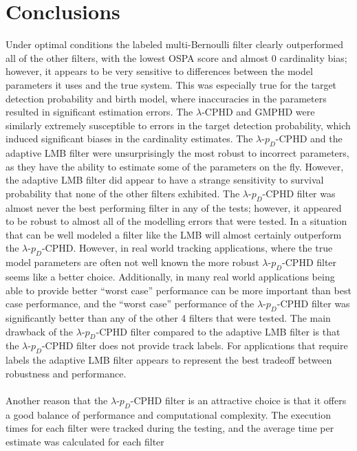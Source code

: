 \documentclass{article}
\newcommand{\lcphd}{$\lambda$-CPHD}
\newcommand{\lpdcphd}{$\lambda$-$p_D$-CPHD}
\begin{document}
\section{Conclusions}
Under optimal conditions the labeled multi-Bernoulli filter clearly outperformed all of the other filters, with the lowest OSPA score and almost 0 cardinality bias; however, it appears to be very sensitive to differences between the model parameters it uses and the true system. This was especially true for the target detection probability and birth model, where inaccuracies in the parameters resulted in significant estimation errors. The \lcphd{} and GMPHD were similarly extremely susceptible to errors in the target detection probability, which induced significant biases in the cardinality estimates. The \lpdcphd{} and the adaptive LMB filter were unsurprisingly the most robust to incorrect parameters, as they have the ability to estimate some of the parameters on the fly. However, the adaptive LMB filter did appear to have a strange sensitivity to survival probability that none of the other filters exhibited. The \lpdcphd{} filter was almost never the best performing filter in any of the tests; however, it appeared to be robust to almost all of the modelling errors that were tested. In a situation that can be well modeled a filter like the LMB will almost certainly outperform the \lpdcphd{}. However, in real world tracking applications, where the true model parameters are often not well known the more robust \lpdcphd{} filter seems like a better choice. Additionally, in many  real world applications being able to provide better ``worst case'' performance can be more important than best case performance, and the ``worst case'' performance of the \lpdcphd{} filter was significantly better than any of the other 4 filters that were tested. The main drawback of the \lpdcphd{} filter compared to the adaptive LMB filter is that the \lpdcphd{} filter does not provide track labels. For applications that require labels the adaptive LMB filter appears to represent the best tradeoff between robustness and performance.\\
\\
Another reason that the \lpdcphd{} filter is an attractive choice is that it offers a good balance of performance and computational complexity. The execution times for each filter were tracked during the testing, and the average time per estimate was calculated for each filter
\end{document}
